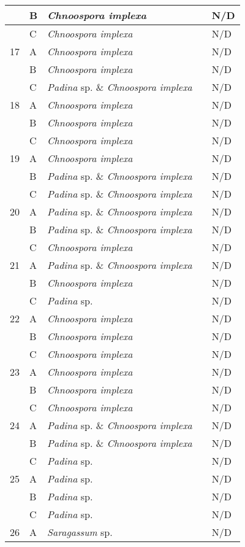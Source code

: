 \documentclass[12pt]{article}
\begin{document}
\begin{longtable}{ | p{1cm} | p{1cm} | p{3cm} | p{4cm} | p{4cm} | }
\hline
&B&\emph{Chnoospora implexa}&&N/D\\
\hline
&C&\emph{Chnoospora implexa}&&N/D\\
\hline
17&A&\emph{Chnoospora implexa}&&N/D\\
\hline
&B&\emph{Chnoospora implexa}&&N/D\\
\hline
&C&\emph{Padina} sp. \& \emph{Chnoospora implexa}&&N/D\\
\hline
18&A&\emph{Chnoospora implexa}&&N/D\\
\hline
&B&\emph{Chnoospora implexa}&&N/D\\
\hline
&C&\emph{Chnoospora implexa}&&N/D\\
\hline
19&A&\emph{Chnoospora implexa}&&N/D\\
\hline
&B&\emph{Padina} sp. \& \emph{Chnoospora implexa}&&N/D\\
\hline
&C&\emph{Padina} sp. \& \emph{Chnoospora implexa}&&N/D\\
\hline
20&A&\emph{Padina} sp. \& \emph{Chnoospora implexa}&&N/D\\
\hline
&B&\emph{Padina} sp. \& \emph{Chnoospora implexa}&&N/D\\
\hline
&C&\emph{Chnoospora implexa}&&N/D\\
\hline
21&A&\emph{Padina} sp. \& \emph{Chnoospora implexa}&&N/D\\
\hline
&B&\emph{Chnoospora implexa}&&N/D\\
\hline
&C&\emph{Padina} sp.&&N/D\\
\hline
22&A&\emph{Chnoospora implexa}&&N/D\\
\hline
&B&\emph{Chnoospora implexa}&&N/D\\
\hline
&C&\emph{Chnoospora implexa}&&N/D\\
\hline
23&A&\emph{Chnoospora implexa}&&N/D\\
\hline
&B&\emph{Chnoospora implexa}&&N/D\\
\hline
&C&\emph{Chnoospora implexa}&&N/D\\
\hline
24&A&\emph{Padina} sp. \& \emph{Chnoospora implexa}&&N/D\\
\hline
&B&\emph{Padina} sp. \& \emph{Chnoospora implexa}&&N/D\\
\hline
&C&\emph{Padina} sp.&&N/D\\
\hline
25&A&\emph{Padina} sp.&&N/D\\
\hline
&B&\emph{Padina} sp.&&N/D\\
\hline
&C&\emph{Padina} sp.&&N/D\\
\hline
26&A&\emph{Saragassum} sp.&&N/D\\

\end{longtable}
\end{document}
